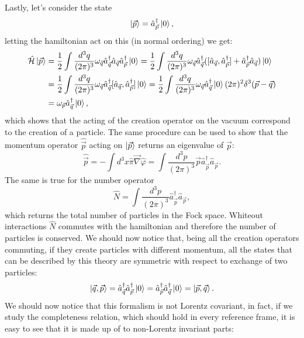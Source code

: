 Lastly, let's consider the state
\begin{equation*}
    \ket{\vec{p}}=\hat{a}^\dagger_{\vec p}\ket{0},
\end{equation*} 
letting the hamiltonian act on this (in normal ordering) we get:
\begin{align*}
    \hat{\mathcal{H} }\ket{\vec{p}}&=\frac{1}{2}\int\frac{d^3q}{(2\pi)^3}\omega_{\vec{q}}\hat{a}^\dagger_{\vec{q}}\hat{a}_{\vec{q}}\hat{a}^\dagger_{\vec{p}}\ket{0}=\frac{1}{2}\int\frac{d^3q}{(2\pi)^3}\omega_{\vec{q}}\hat{a}^\dagger_{\vec{q}}([\hat{a}_{\vec{q}},\hat{a}^\dagger_{\vec{p}}]+\hat{a}^\dagger_{\vec{p}}\hat{a}_{\vec{q}})\ket{0}\\&=\frac{1}{2}\int\frac{d^3q}{(2\pi)^3}\omega_{\vec{q}}\hat{a}^\dagger_{\vec{q}}[\hat{a}_{\vec{q}},\hat{a}^\dagger_{\vec{p}}]\ket{0}=\frac{1}{2}\int\frac{d^3q}{(2\pi)^3}\omega_{\vec{q}}\hat{a}^\dagger_{\vec{q}}\ket{0}(2\pi)^2\delta^3(\vec p-\vec q)\\&=\omega_{\vec{p}}\hat{a}^\dagger_{\vec{q}}\ket{0},
\end{align*}
which shows that the acting of the creation operator on the vacuum correspond to the creation of a particle.
The same procedure can be used to show that the momentum operator $\hat{\vec{p}}$ acting on $\ket{\vec p}$ returns an eigenvalue of $\vec p$:
\begin{equation*}
    \hat{\vec{p}}=-\int d^3x\hat{\pi}\vec{\nabla}\hat{\varphi}=\int\frac{d^3p}{(2\pi)^3}\vec{p}\hat{a}_{\vec{p}}^\dagger\hat{a}_{\vec{p}}.
\end{equation*}
The same is true for the number operator 
\begin{equation*}
    \hat{N}=\int\frac{d^3p}{(2\pi)^3}\hat{a}_{\vec{p}}^\dagger\hat{a}_{\vec{p}},
\end{equation*}
which returns the total number of particles in the Fock space. Whiteout interactions $\hat N$ commutes with the hamiltonian and therefore the number of particles is conserved. We should now notice that, being all the creation operators commuting, if they create particles with different momentum, all the states that can be described by this theory are symmetric with respect to exchange of two particles:
\begin{equation*}
    \ket{\vec q, \vec p}=\hat{a}^\dagger_{\vec{q}}\hat{a}^\dagger_{\vec{p}}\ket{0}=\hat{a}^\dagger_{\vec{p}}\hat{a}^\dagger_{\vec{q}}\ket{0}=\ket{\vec p,\vec q}.
\end{equation*}
We should now notice that this formalism is not Lorentz covariant, in fact, if we study the completeness relation, which should hold in every reference frame, it is easy to see that it is made up of to non-Lorentz invariant parts:
